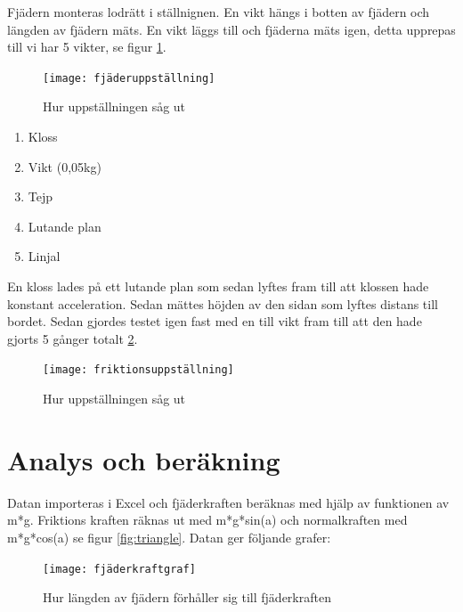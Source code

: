 \documentclass[11p, titlepage, oneside, a4paper]{article}
\begin{document}
        Fjädern monteras lodrätt i ställnignen. En vikt hängs i botten av fjädern och längden av fjädern mäts. En vikt läggs till och fjäderna mäts igen, detta upprepas till vi har 5 vikter, se figur \ref{fig:fjäderuppställning}.

        \begin{figure}[!h]
            \texttt{[image: fjäderuppställning]}
            \caption{Hur uppställningen såg ut}
            \label{fig:fjäderuppställning}
        \end{figure}

        \subtitle{Friktions- och normalkraft}

        \begin{enumerate}
            \item Kloss
            \item Vikt (0,05kg)
            \item Tejp
            \item Lutande plan
            \item Linjal
        \end{enumerate}
        
        En kloss lades på ett lutande plan som sedan lyftes fram till att klossen hade konstant acceleration. Sedan mättes höjden av den sidan som lyftes distans till bordet. Sedan gjordes testet igen fast med en till vikt fram till att den hade gjorts 5 gånger totalt \ref{fig:friktionsuppställning}.

        \begin{figure}[!h]
            \texttt{[image: friktionsuppställning]}
            \caption{Hur uppställningen såg ut}
            \label{fig:friktionsuppställning}
        \end{figure}

    \newpage
    \section{Analys och beräkning}
    Datan importeras i Excel och fjäderkraften beräknas med hjälp av funktionen av m*g. Friktions kraften räknas ut med m*g*sin(a) och normalkraften med m*g*cos(a) se figur \ref{fig:triangle}. Datan ger följande grafer:

    \begin{figure}[!h]
        \texttt{[image: fjäderkraftgraf]}
        \caption{Hur längden av fjädern förhåller sig till fjäderkraften}
        \label{fig:fjädergraf}
    \end{figure}
\end{document}
